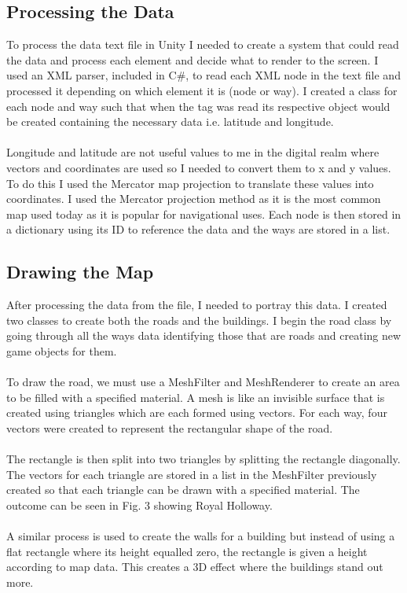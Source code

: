 \documentclass[a4paper]{report}
\begin{document}
\subsection{Processing the Data}
To process the data text file in Unity I needed to create a system that could read the data and process each element and decide what to render to the screen. I used an XML parser, included in C\#, to read each XML node in the text file and processed it depending on which element it is (node or way). I created a class for each node and way such that when the tag was read its respective object would be created containing the necessary data i.e. latitude and longitude. 
\\\\
Longitude and latitude are not useful values to me in the digital realm where vectors and coordinates are used so I needed to convert them to x and y values. To do this I used the Mercator map projection to translate these values into coordinates. I used the Mercator projection method as it is the most common map used today as it is popular for navigational uses. Each node is then stored in a dictionary using its ID to reference the data and the ways are stored in a list. 
\subsection{Drawing the Map}
After processing the data from the file, I needed to portray this data. I created two classes to create both the roads and the buildings. I begin the road class by going through all the ways data identifying those that are roads and creating new game objects for them.  
\\\\
To draw the road, we must use a MeshFilter and MeshRenderer to create an area to be filled with a specified material. A mesh is like an invisible surface that is created using triangles which are each formed using vectors. For each way, four vectors were created to represent the rectangular shape of the road.  
\\\\
The rectangle is then split into two triangles by splitting the rectangle diagonally. The vectors for each triangle are stored in a list in the MeshFilter previously created so that each triangle can be drawn with a specified material. The outcome can be seen in Fig. 3 showing Royal Holloway.
\\\\
A similar process is used to create the walls for a building but instead of using a flat rectangle where its height equalled zero, the rectangle is given a height according to map data. This creates a 3D effect where the buildings stand out more. 
\end{document}
